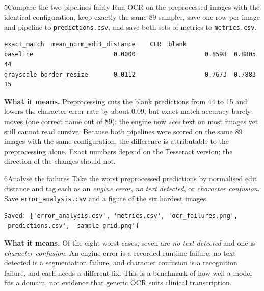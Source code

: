 \begin{labquestion}{5}{Compare the two pipelines fairly}
Run OCR on the preprocessed images with the identical configuration, keep exactly the same 89 samples, save one row per image and pipeline to \texttt{predictions.csv}, and save both sets of metrics to \texttt{metrics.csv}.
\end{labquestion}
\begin{labanswer}

\begin{refoutput}
\begin{lstlisting}[style=utpterminal]
                         exact_match  mean_norm_edit_distance    CER  blank
baseline                      0.0000                   0.8598  0.8805     44
grayscale_border_resize       0.0112                   0.7673  0.7883     15
\end{lstlisting}
\end{refoutput}

\textbf{What it means.} Preprocessing cuts the blank predictions from 44 to 15 and lowers the character error rate by about 0.09, but exact-match accuracy barely moves (one correct name out of 89): the engine now \emph{sees} text on most images yet still cannot read cursive. Because both pipelines were scored on the same 89 images with the same configuration, the difference is attributable to the preprocessing alone. Exact numbers depend on the Tesseract version; the direction of the changes should not.
\end{labanswer}

\begin{labquestion}{6}{Analyse the failures}
Take the worst preprocessed predictions by normalised edit distance and tag each as an \emph{engine error}, \emph{no text detected}, or \emph{character confusion}. Save \texttt{error\_analysis.csv} and a figure of the six hardest images.
\end{labquestion}
\begin{labanswer}

\begin{refoutput}
\begin{lstlisting}[style=utpterminal]
Saved: ['error_analysis.csv', 'metrics.csv', 'ocr_failures.png', 'predictions.csv', 'sample_grid.png']
\end{lstlisting}
\end{refoutput}

\textbf{What it means.} Of the eight worst cases, seven are \emph{no text detected} and one is \emph{character confusion}. An engine error is a recorded runtime failure, no text detected is a segmentation failure, and character confusion is a recognition failure, and each needs a different fix. This is a benchmark of how well a model fits a domain, not evidence that generic OCR suits clinical transcription.
\end{labanswer}

